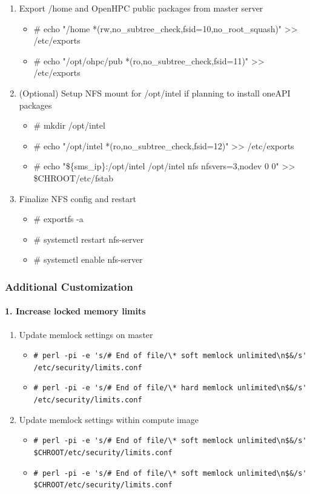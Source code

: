 {\begin{enumerate}
\item Export /home and OpenHPC public packages from master server
\begin{itemize}
\item \# echo "/home *(rw,no\_subtree\_check,fsid=10,no\_root\_squash)" >> /etc/exports
\item \# echo "/opt/ohpc/pub *(ro,no\_subtree\_check,fsid=11)" >> /etc/exports
\end{itemize}

\item (Optional) Setup NFS mount for /opt/intel if planning to install oneAPI packages
\begin{itemize}
\item \# mkdir /opt/intel
\item \# echo "/opt/intel *(ro,no\_subtree\_check,fsid=12)" >> /etc/exports
\item \# echo "\$\{sms\_ip\}:/opt/intel /opt/intel nfs nfsvers=3,nodev 0 0" >> \$CHROOT/etc/fstab 
\end{itemize}

\item Finalize NFS config and restart
\begin{itemize}
\item \# exportfs -a
\item \# systemctl restart nfs-server
\item \# systemctl enable nfs-server
\end{itemize}
\end{enumerate}


\subsubsection{Additional Customization}
\paragraph{1. Increase locked memory limits}
\begin{enumerate}
\item Update memlock settings on master
\begin{itemize}
\item {\tiny \verb|# perl -pi -e 's/# End of file/\* soft memlock unlimited\n$&/s' /etc/security/limits.conf| }
\item {\tiny \verb|# perl -pi -e 's/# End of file/\* hard memlock unlimited\n$&/s' /etc/security/limits.conf|}
\end{itemize}
\item Update memlock settings within compute image
\begin{itemize}
\item {\tiny \verb|# perl -pi -e 's/# End of file/\* soft memlock unlimited\n$&/s' $CHROOT/etc/security/limits.conf|}
\item {\tiny \verb|# perl -pi -e 's/# End of file/\* soft memlock unlimited\n$&/s' $CHROOT/etc/security/limits.conf|}
\end{itemize}
\end{enumerate}

}
